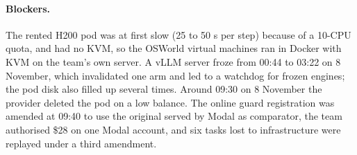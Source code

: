 \paragraph{Blockers.} The rented H200 pod was at first slow (25 to 50 s per step) because of a 10-CPU quota, and had no KVM, so the OSWorld virtual machines ran in Docker with KVM on the team's own server. A vLLM server froze from 00:44 to 03:22 on 8 November, which invalidated one arm and led to a watchdog for frozen engines; the pod disk also filled up several times. Around 09:30 on 8 November the provider deleted the pod on a low balance. The online guard registration was amended at 09:40 to use the original served by Modal as comparator, the team authorised \$28 on one Modal account, and six tasks lost to infrastructure were replayed under a third amendment. %
